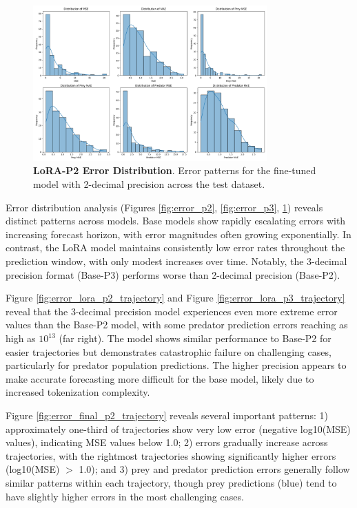 \documentclass{article}
\begin{document}
\begin{figure}[H]
    \centering
    \includegraphics[width=0.8\textwidth]{error_distributions_final}
    \caption{\textbf{LoRA-P2 Error Distribution}. Error patterns for the fine-tuned model with 2-decimal precision across the test dataset.}
    \label{fig:error_lora_p2}
\end{figure}

Error distribution analysis (Figures \ref{fig:error_p2}, \ref{fig:error_p3}, \ref{fig:error_lora_p2}) reveals distinct patterns across models. Base models show rapidly escalating errors with increasing forecast horizon, with error magnitudes often growing exponentially. In contrast, the LoRA model maintains consistently low error rates throughout the prediction window, with only modest increases over time. Notably, the 3-decimal precision format (Base-P3) performs worse than 2-decimal precision (Base-P2).

Figure \ref{fig:error_lora_p2_trajectory} and Figure \ref{fig:error_lora_p3_trajectory} reveal that the 3-decimal precision model experiences even more extreme error values than the Base-P2 model, with some predator prediction errors reaching as high as $10^{13}$ (far right). The model shows similar performance to Base-P2 for easier trajectories but demonstrates catastrophic failure on challenging cases, particularly for predator population predictions. The higher precision appears to make accurate forecasting more difficult for the base model, likely due to increased tokenization complexity.

Figure \ref{fig:error_final_p2_trajectory} reveals several important patterns: 1) approximately one-third of trajectories show very low error (negative log10(MSE) values), indicating MSE values below 1.0; 2) errors gradually increase across trajectories, with the rightmost trajectories showing significantly higher errors (log10(MSE) $>$ 1.0); and 3) prey and predator prediction errors generally follow similar patterns within each trajectory, though prey predictions (blue) tend to have slightly higher errors in the most challenging cases.
\end{document}
